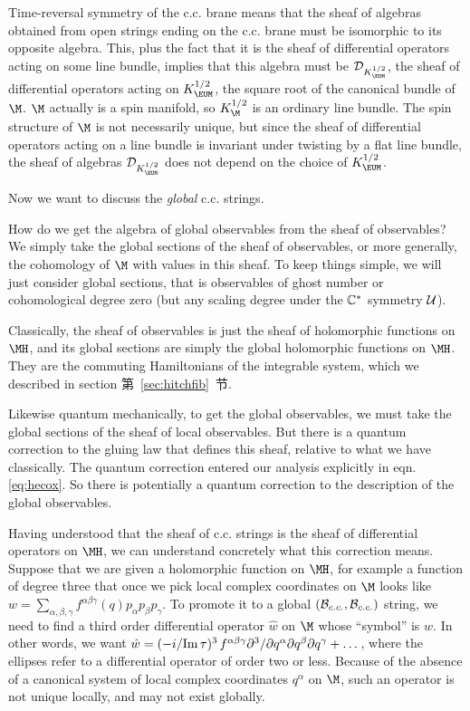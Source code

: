 Time-reversal symmetry of the c.c. brane means that the sheaf of
algebras obtained from open strings ending on the c.c. brane must
be isomorphic to its opposite algebra.  This, plus the fact that
it is the sheaf of differential operators acting on some line
bundle, implies that this algebra must be ${\cal
D}_{K_{\EUM}^{1/2}}$, the sheaf of differential operators acting
on $K_{\EUM}^{1/2}$, the square root of the canonical bundle of
$\M$. $\M$ actually is a spin manifold, so $K_\M^{1/2}$ is an
ordinary line bundle.  The spin structure of $\M$ is not
necessarily unique, but since the sheaf of differential operators
acting on a line bundle is invariant under twisting by a flat line
bundle, the sheaf of algebras ${\cal D}_{K_\EUM^{1/2}}$ does not
depend on the choice of $K_{\EUM}^{1/2}$.

\par{}

Now we want to discuss the {\it global} c.c. strings.

How do we get the algebra of global observables from the sheaf of
observables?  We simply take the global sections of the sheaf of
observables, or more generally, the cohomology of $\M$ with values
in this sheaf. To keep things simple, we will just consider global
sections, that is observables of ghost number or cohomological
degree zero (but any scaling degree under the $\Bbb{C}^*$ symmetry
${\cal U}$).

Classically, the sheaf of observables is just the sheaf of
holomorphic functions on $\MH$, and its global sections are simply
the global holomorphic functions on $\MH$.  They are the commuting
Hamiltonians of the integrable system, which we described in
section 第~\ref{sec:hitchfib}~节.

Likewise quantum mechanically, to get the global observables, we
must take the global sections of the sheaf of local observables.
But there is a quantum correction to the gluing law that defines
this sheaf, relative to what we have classically.  The quantum
correction entered our analysis explicitly in eqn. \eqref{eq:hecox}. So
there is potentially a quantum correction to the description of
the global observables.

Having understood that the sheaf of c.c. strings is the sheaf of
differential operators on $\MH$, we can understand concretely what
this correction means.  Suppose that we are given a holomorphic
function on $\MH$, for example a function of degree three that
once we pick local complex coordinates on $\M$ looks like
$w=\sum_{\alpha,\beta,\gamma} f^{\alpha\beta\gamma}(q)p_\alpha
p_\beta p_\gamma$.  To promote it to a global $({\cal
B}_{c.c.},{\cal B}_{c.c.})$ string, we need to find a third order
differential operator $\hat w$ on $\M$ whose ``symbol'' is $w$. In
other words, we want $\hat w=(-i/{\rm
Im}\,\tau)^3\,f^{\alpha\beta\gamma}\partial^3 /\partial
q^\alpha\partial q^\beta\partial q^\gamma+\dots$, where the
ellipses refer to a differential operator of order two or less.
Because of the absence of a canonical system of local complex
coordinates $q^\alpha$ on $\M$, such an operator is not unique
locally, and may not exist globally.

